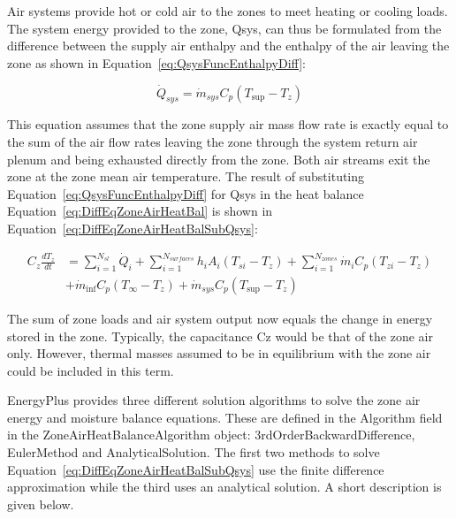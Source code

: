 Air systems provide hot or cold air to the zones to meet heating or cooling loads. The system energy provided to the zone, Qsys, can thus be formulated from the difference between the supply air enthalpy and the enthalpy of the air leaving the zone as shown in Equation~\ref{eq:QsysFuncEnthalpyDiff}:

\begin{equation}
{\dot Q_{sys}} = {\dot m_{sys}}{C_p}\left( {{T_{\sup }} - {T_z}} \right)
\label{eq:QsysFuncEnthalpyDiff}
\end{equation}

This equation assumes that the zone supply air mass flow rate is exactly equal to the sum of the air flow rates leaving the zone through the system return air plenum and being exhausted directly from the zone. Both air streams exit the zone at the zone mean air temperature. The result of substituting Equation~\ref{eq:QsysFuncEnthalpyDiff} for Qsys in the heat balance Equation~\ref{eq:DiffEqZoneAirHeatBal} is shown in Equation~\ref{eq:DiffEqZoneAirHeatBalSubQsys}:

\begin{equation}
\begin{array}{ll}
    {C_z}\frac{{d{T_z}}}{{dt}} & = \sum\limits_{i = 1}^{{N_{sl}}} {{{\dot Q}_i}}  + \sum\limits_{i = 1}^{{N_{surfaces}}} {{h_i}} {A_i}\left( {{T_{si}} - {T_z}} \right) + \sum\limits_{i = 1}^{{N_{zones}}} {{{\dot m}_i}} {C_p}\left( {{T_{zi}} - {T_z}} \right) \\
                               &+ {{\dot m}_{\inf }}{C_p}\left( {{T_\infty } - {T_z}} \right) + {{\dot m}_{sys}}{C_p}\left( {{T_{\sup }} - {T_z}} \right)
  \end{array}
\label{eq:DiffEqZoneAirHeatBalSubQsys}
\end{equation}

The sum of zone loads and air system output now equals the change in energy stored in the zone. Typically, the capacitance Cz would be that of the zone air only. However, thermal masses assumed to be in equilibrium with the zone air could be included in this term.

EnergyPlus provides three different solution algorithms to solve the zone air energy and moisture balance equations. These are defined in the Algorithm field in the ZoneAirHeatBalanceAlgorithm object: 3rdOrderBackwardDifference, EulerMethod and AnalyticalSolution. The first two methods to solve Equation~\ref{eq:DiffEqZoneAirHeatBalSubQsys} use the finite difference approximation while the third uses an analytical solution. A short description is given below.

